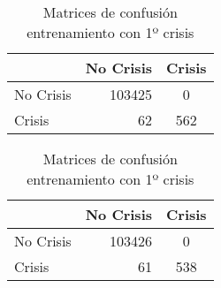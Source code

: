 \begin{table}
\begin{center}
        \begin{subtable}[c]{0.4\textwidth}
            \begin{tabular}{lrc}
                \hline
                 & No Crisis & Crisis \\
                \hline
                No Crisis & 103425 & 0 \\
                Crisis & 62 & 562\\
                \hline
            \end{tabular}
            \label{tab:mat-conf-raw-1.3}
        \end{subtable}
        \hspace{1em}\vspace{1em}
        \begin{subtable}[c]{0.4\textwidth}
                \begin{tabular}{lrc}
                \hline
                 & No Crisis & Crisis \\
                \hline
                No Crisis & 103426 & 0 \\
                Crisis & 61 & 538\\
                \hline
            \end{tabular}
            \label{tab:mat-conf-stats-1.3}
        \end{subtable}
        \caption{Matrices de confusión entrenamiento con 1º crisis}
        \label{tab:matriz-conf-1a}
    \end{center}
\end{table}


